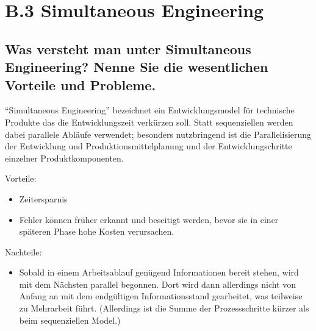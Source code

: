 \section*{B.3 Simultaneous Engineering}

\subsection{Was versteht man unter Simultaneous Engineering? Nenne Sie die wesentlichen Vorteile und Probleme.}
``Simultaneous Engineering'' bezeichnet ein Entwicklungsmodel f\"ur technische Produkte das die Entwicklungszeit
verk\"urzen soll.
Statt sequenziellen werden dabei parallele Abl\"aufe verwendet; besonders nutzbringend ist die Parallelisierung
der Entwicklung und Produktionsmittelplanung und der Entwicklungschritte einzelner Produktkomponenten.

Vorteile:
\begin{itemize}
	\item Zeitersparnis
	\item Fehler k\"onnen fr\"uher erkannt und beseitigt werden, bevor sie in einer späteren Phase hohe Kosten verursachen.
\end{itemize}
Nachteile:
\begin{itemize}
	\item Sobald in einem Arbeitsablauf gen\"ugend Informationen bereit stehen, wird mit dem N\"achsten parallel
		begonnen. Dort wird dann allerdings nicht von Anfang an mit dem endg\"ultigen Informationsstand gearbeitet,
		was teilweise zu Mehrarbeit f\"uhrt. (Allerdings ist die Summe der Prozessschritte k\"urzer als beim sequenziellen Model.)
\end{itemize}
